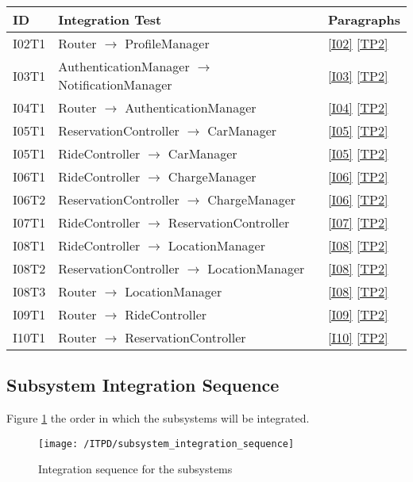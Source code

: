 	\begin{center}
		\vspace{0.6cm}
		\begin{tabular}{|l|l|l|}
			\hline
			\textbf{ID} & \textbf{Integration Test} & \textbf{Paragraphs} \bigstrut \\\hline
			\hline
			I02T1 & Router \ensuremath{\rightarrow} ProfileManager & \ref{I02}  \ref{TP2} \bigstrut \\\hline
			I03T1 & AuthenticationManager \ensuremath{\rightarrow} NotificationManager & \ref{I03}  \ref{TP2} \bigstrut \\\hline
			I04T1 & Router \ensuremath{\rightarrow} AuthenticationManager & \ref{I04}  \ref{TP2} \bigstrut \\\hline
			I05T1 & ReservationController \ensuremath{\rightarrow} CarManager & \ref{I05}  \ref{TP2} \bigstrut \\\hline
			I05T1 & RideController \ensuremath{\rightarrow} CarManager & \ref{I05}  \ref{TP2} \bigstrut \\\hline
			I06T1 & RideController \ensuremath{\rightarrow} ChargeManager & \ref{I06}  \ref{TP2} \bigstrut \\\hline
			I06T2 & ReservationController \ensuremath{\rightarrow} ChargeManager & \ref{I06}  \ref{TP2} \bigstrut \\\hline
			I07T1 & RideController \ensuremath{\rightarrow} ReservationController & \ref{I07}  \ref{TP2} \bigstrut \\\hline
			I08T1 & RideController \ensuremath{\rightarrow} LocationManager & \ref{I08}  \ref{TP2} \bigstrut \\\hline
			I08T2 & ReservationController \ensuremath{\rightarrow} LocationManager & \ref{I08}  \ref{TP2} \bigstrut \\\hline
			I08T3 & Router \ensuremath{\rightarrow} LocationManager & \ref{I08}  \ref{TP2} \bigstrut \\\hline
			I09T1 & Router \ensuremath{\rightarrow} RideController & \ref{I09}  \ref{TP2} \bigstrut \\\hline
			I10T1 & Router \ensuremath{\rightarrow} ReservationController & \ref{I10}  \ref{TP2} \bigstrut \\\hline
		\end{tabular}
	\end{center}

	\newpage
	\subsection{Subsystem Integration Sequence}
	Figure \ref{fig:subsystem_integration_sequence} the order in which the subsystems will be integrated.

	\begin{figure}[!ht]
	  \centering
	  \vspace{0.2cm}
	  \texttt{[image: /ITPD/subsystem\_integration\_sequence]}\\
	  \vspace{0.2cm}
	  \caption{Integration sequence for the subsystems} 
	  \label{fig:subsystem_integration_sequence} 
	\end{figure}
